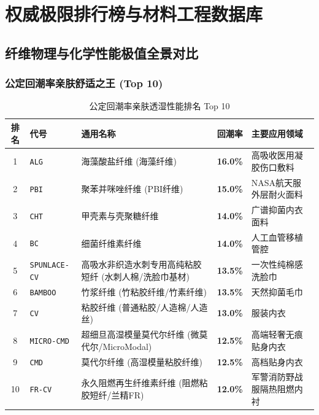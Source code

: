 \documentclass[11pt,openright,twoside,UTF8]{ctexbook}
\begin{document}
\part{权威极限排行榜与材料工程数据库}

\chapter{纤维物理与化学性能极值全景对比}

\section{公定回潮率亲肤舒适之王 (Top 10)}
\begin{table}[htbp]
\centering
\small
\caption{公定回潮率亲肤透湿性能排名 Top 10}
\begin{tabularx}{\textwidth}{cp{2.2cm}p{3.8cm}cp{4.5cm}}
\toprule
\textbf{排名} & \textbf{代号} & \textbf{通用名称} & \textbf{回潮率} & \textbf{主要应用领域} \\
\midrule
1 & \texttt{ALG} & 海藻酸盐纤维 (海藻纤维) & \textbf{16.0\%} & 高吸收医用凝胶伤口敷料 \\ 
2 & \texttt{PBI} & 聚苯并咪唑纤维 (PBI纤维) & \textbf{15.0\%} & NASA航天服外层耐火面料 \\ 
3 & \texttt{CHT} & 甲壳素与壳聚糖纤维 & \textbf{14.0\%} & 广谱抑菌内衣面料 \\ 
4 & \texttt{BC} & 细菌纤维素纤维 & \textbf{14.0\%} & 人工血管移植管腔 \\ 
5 & \texttt{SPUNLACE-CV} & 高吸水非织造水刺专用高纯粘胶短纤 (水刺人棉/洗脸巾基材) & \textbf{13.5\%} & 一次性纯棉感洗脸巾 \\ 
6 & \texttt{BAMBOO} & 竹浆纤维 (竹粘胶纤维/竹素纤维) & \textbf{13.5\%} & 天然抑菌毛巾 \\ 
7 & \texttt{CV} & 粘胶纤维 (普通粘胶/人造棉/人造丝) & \textbf{13.0\%} & 服装内衣 \\ 
8 & \texttt{MICRO-CMD} & 超细旦高湿模量莫代尔纤维 (微莫代尔/MicroModal) & \textbf{12.5\%} & 高端轻奢无痕贴身内衣 \\ 
9 & \texttt{CMD} & 莫代尔纤维 (高湿模量粘胶纤维) & \textbf{12.5\%} & 高档贴身内衣 \\ 
10 & \texttt{FR-CV} & 永久阻燃再生纤维素纤维 (阻燃粘胶短纤/兰精FR) & \textbf{12.0\%} & 军警消防野战服隔热阻燃内衬 \\ 
\bottomrule
\end{tabularx}
\end{table}
\end{document}
